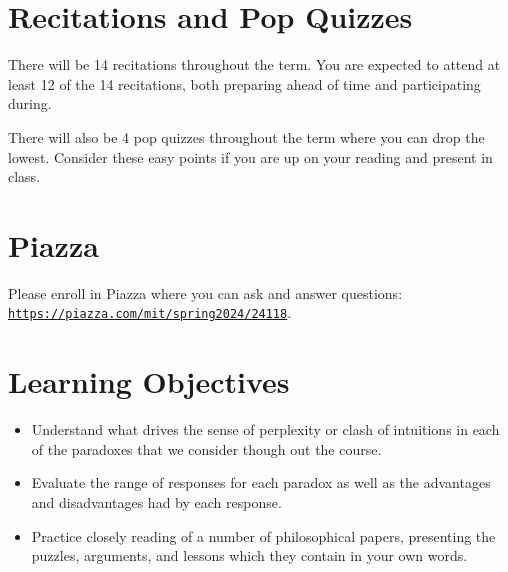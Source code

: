 \documentclass[letterpaper]{infinity_syllabus} %
\begin{document}
\vspace{0.5cm}
\section{Recitations and Pop Quizzes}

There will be 14 recitations throughout the term.
You are expected to attend at least 12 of the 14 recitations, both preparing ahead of time and participating during.

There will also be 4 pop quizzes throughout the term where you can drop the lowest.
Consider these easy points if you are up on your reading and present in class.


\vspace{0.5cm}
\section{Piazza}

Please enroll in Piazza where you can ask and answer questions:\\
\href{https://piazza.com/mit/spring2024/24118}{\texttt{https://piazza.com/mit/spring2024/24118}}.



\newpage %

\makeSide %


\vspace{0.5cm}
\section{Learning Objectives}

\begin{itemize}
  \item Understand what drives the sense of perplexity or clash of intuitions in each of the paradoxes that we consider though out the course.
  \item Evaluate the range of responses for each paradox as well as the advantages and disadvantages had by each response.
  \item Practice closely reading of a number of philosophical papers, presenting the puzzles, arguments, and lessons which they contain in your own words.
\end{itemize}
\end{document}
